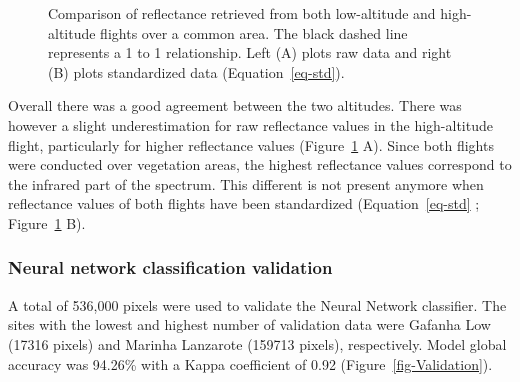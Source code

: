 \documentclass[
  number]{elsarticle}
\begin{document}
\label{cell-fig-CompareRef}
\begin{figure}[H]


\caption{\label{fig-CompareRef}Comparison of reflectance retrieved from
both low-altitude and high-altitude flights over a common area. The
black dashed line represents a 1 to 1 relationship. Left (A) plots raw
data and right (B) plots standardized data (Equation~\ref{eq-std}).}

\end{figure}%

Overall there was a good agreement between the two altitudes. There was
however a slight underestimation for raw reflectance values in the
high-altitude flight, particularly for higher reflectance values
(Figure~\ref{fig-CompareRef} A). Since both flights were conducted over
vegetation areas, the highest reflectance values correspond to the
infrared part of the spectrum. This different is not present anymore
when reflectance values of both flights have been standardized
(Equation~\ref{eq-std} ; Figure~\ref{fig-CompareRef} B).

\subsubsection{Neural network classification
validation}\label{neural-network-classification-validation}

A total of 536,000 pixels were used to validate the Neural Network
classifier. The sites with the lowest and highest number of validation
data were Gafanha Low (17316 pixels) and Marinha Lanzarote (159713
pixels), respectively. Model global accuracy was 94.26\% with a Kappa
coefficient of 0.92 (Figure~\ref{fig-Validation}).
\end{document}
